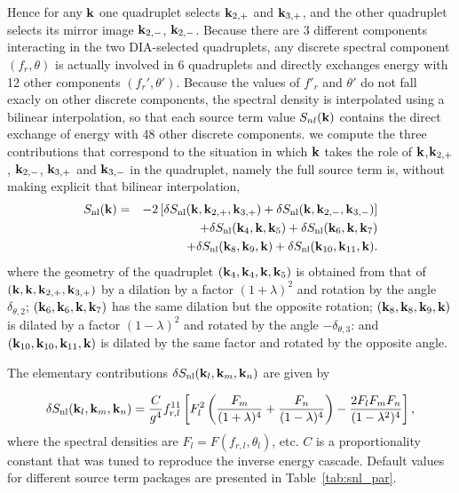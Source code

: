 Hence for any $\mbox{\bf k}$ one quadruplet selects $\mbox{\bf k}_{2,+}$ and $\mbox{\bf k}_{3,+}$, and the other quadruplet selects its mirror image 
$\mbox{\bf k}_{2,-}$, $\mbox{\bf k}_{2,-}$. Because there are 3 different components interacting in the two DIA-selected quadruplets, any discrete spectral component $(f_r,\theta)$ is actually involved in 6 quadruplets and directly exchanges energy with 12 other components $(f_r',\theta')$. Because the values of $f'_r$ and $\theta'$ do not fall exacly on other discrete components, the spectral density is interpolated using a bilinear interpolation, so that each source term value
$S_{nl}(\mbox{\bf k})$ contains the direct exchange of energy with 48 other discrete components. 
we compute the three contributions that correspond to the situation in which $\mbox{\bf k}$ takes the role of $\mbox{\bf k}$,$\mbox{\bf k}_{2,+}$, $\mbox{\bf k}_{2,-}$, $\mbox{\bf k}_{3,+}$  and $\mbox{\bf k}_{3,-}$ in the quadruplet, namely the full source term is, without making explicit that bilinear interpolation, 
\begin{eqnarray} 
S_{\mathrm{nl}}(\mbox{\bf k}) &=& -2  \left[\delta S_{\mathrm{nl}}(\mbox{\bf k},\mbox{\bf k}_{2,+},\mbox{\bf k}_{3,+})+\delta S_{\mathrm{nl}}(\mbox{\bf k},\mbox{\bf k}_{2,-},\mbox{\bf k}_{3,-})\right] \nonumber  \\
 & & + \delta  S_{\mathrm{nl}}(\mbox{\bf k}_4,\mbox{\bf k},\mbox{\bf k}_5) + \delta  S_{\mathrm{nl}}(\mbox{\bf k}_6,\mbox{\bf k},\mbox{\bf k}_7)  \\
     & &        +   \delta S_{\mathrm{nl}}(\mbox{\bf k}_8,\mbox{\bf k}_9,\mbox{\bf k}) + \delta S_{\mathrm{nl}}(\mbox{\bf k}_{10},\mbox{\bf k}_{11},\mbox{\bf k}) . \label{eq:diasum}
\end{eqnarray}
where the geometry of the quadruplet $(\mbox{\bf k}_4,\mbox{\bf k}_4,\mbox{\bf k},\mbox{\bf k}_5)$ is obtained from that of $(\mbox{\bf k},\mbox{\bf k},\mbox{\bf k}_{2,+},\mbox{\bf k}_{3,+})$ by a dilation by a factor $(1+\lambda)^2$ and rotation by the angle $\delta_{\theta,2}$;  $(\mbox{\bf k}_6,\mbox{\bf k}_6,\mbox{\bf k},\mbox{\bf k}_7)$ has the same dilation but the opposite rotation; $(\mbox{\bf k}_8,\mbox{\bf k}_8,\mbox{\bf k}_9,\mbox{\bf k})$ is dilated by a factor  $(1-\lambda)^2$ and rotated by the angle $-\delta_{\theta,3}$: and $(\mbox{\bf k}_{10},\mbox{\bf k}_{10},\mbox{\bf k}_{11},\mbox{\bf k})$ is dilated by the same factor and rotated by the opposite angle. 


The elementary contributions $\delta  S_{\mathrm{nl}}(\mbox{\bf k}_l,\mbox{\bf k}_m,\mbox{\bf k}_n)$   are given by  

\begin{equation}
\delta S_{\mathrm{nl}}(\mbox{\bf k}_l,\mbox{\bf k}_m,\mbox{\bf k}_n) =  \frac{C}{g^4} f_{r,l}^{11} \left [ F_l^2 \left ( \frac{F_m}{(1+\lambda)^4} +
        \frac{F_n}{(1-\lambda)^4} \right ) - \frac{2 F_l F_m F_n}{(1-\lambda^2)^4} \right] ,
      \label{eq:snl_dia}
\end{equation}
where the spectral densities are  $F_l = F(f_{r,l} ,\theta_l)$, etc. 
 $C$ is a proportionality constant that was tuned to reproduce the inverse energy cascade.  Default values for different source term packages are presented in Table~\ref{tab:snl_par}.


